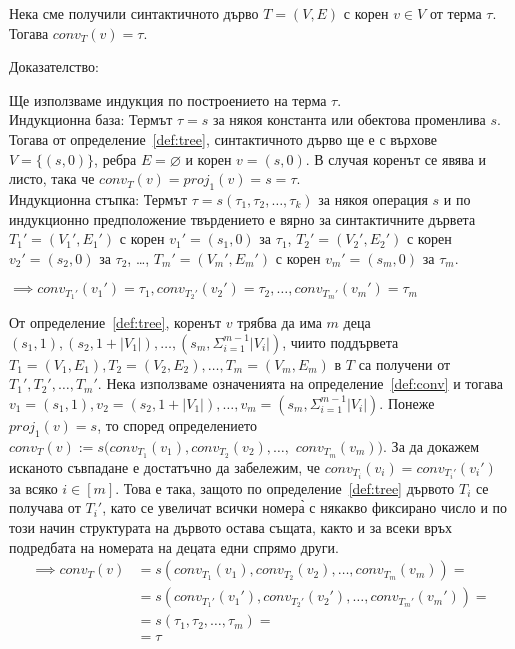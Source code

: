 \documentclass[12pt,twoside,a4paper]{article}
\begin{document}
	\begin{lemma}\label{lemma:conv-tau} Нека сме получили синтактичното дърво $T=(V,E)$ с корен $v \in V$ от терма $\tau$. Тогава $conv_T(v) = \tau$.
		
		\noindent Доказателство:
		
		Ще използваме индукция по построението на терма $\tau$.\\
		\indent Индукционна база: Термът $\tau = s$ за някоя константа или обектова променлива $s$.\\
		Тогава от определение~\ref{def:tree}, синтактичното дърво ще е с върхове $V=\{(s,0)\}$, ребра $E=\varnothing$ и корен $v=(s,0)$. В случая коренът се явява и листо, така че $conv_T(v)=proj_1(v)=s = \tau$.\\
		\indent Индукционна стъпка: Термът $\tau = s(\tau_1, \tau_2, \dots, \tau_k)$ за някоя операция $s$ и по индукционно предположение твърдението е вярно за синтактичните дървета $T_1'=(V_1',E_1')$ с корен $v_1'=(s_1, 0)$ за $\tau_1$, $T_2'=(V_2',E_2')$ с корен $v_2'=(s_2, 0)$ за $\tau_2$, \dots, $T_m'=(V_m',E_m')$ с корен $v_m'=(s_m, 0)$ за $\tau_m$.
		
		\noindent$\implies conv_{T_1'}(v_1') = \tau_1, conv_{T_2'}(v_2') = \tau_2, \dots, conv_{T_m'}(v_m') = \tau_m$
		
		От определение~\ref{def:tree}, коренът $v$ трябва да има $m$ деца $(s_1, 1), (s_2, 1+|V_1|), \dots, (s_m, \Sigma_{i=1}^{m-1}{|V_i|})$, чиито поддървета $T_1=(V_1,E_1), T_2=(V_2,E_2), \dots, T_m=(V_m,E_m)$ в $T$ са получени от $T_1', T_2', \dots, T_m'$. Нека използваме означенията на определение~\ref{def:conv} и тогава $v_1=(s_1, 1), v_2=(s_2, 1+|V_1|), \dots, v_m=(s_m, \Sigma_{i=1}^{m-1}{|V_i|})$. Понеже $proj_1(v)=s$, то според определението $conv_T(v):=s(conv_{T_1}(v_1), conv_{T_2}(v_2),\dots,$ $ conv_{T_m}(v_m))$. За да докажем исканото съвпадане е достатъчно да забележим, че $conv_{T_i}(v_i) = conv_{T_i'}(v_i')$ за всяко $i \in [m]$. Това е така, защото по определение~\ref{def:tree} дървото $T_i$ се получава от $T_i'$, като се увеличат всички номера̀ с някакво фиксирано число и по този начин структурата на дървото остава същата, както и за всеки връх подредбата на номерата на децата едни спрямо други.\\
		\vspace{-0.2cm}
		\begin{equation*}
			\begin{split}
				\implies conv_T(v)
				&= s(conv_{T_1}(v_1), conv_{T_2}(v_2), \dots, conv_{T_m}(v_m)) =\\
				&= s(conv_{T_1'}(v_1'), conv_{T_2'}(v_2'), \dots, conv_{T_m'}(v_m')) =\\
				&= s(\tau_1, \tau_2, \dots, \tau_m) =\\
				&= \tau
			\end{split}
		\end{equation*}
	\end{lemma}
	
\end{document}
